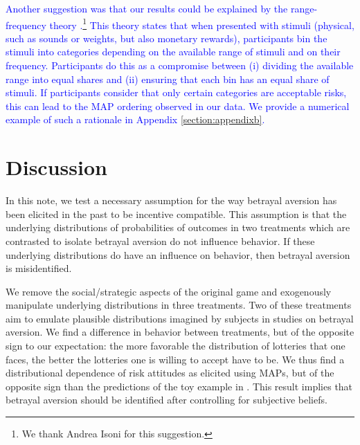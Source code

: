 \textcolor{blue}{Another suggestion was that our results could be explained by the range-frequency theory \citep{Parducci1965,Parducci1971}.\footnote{We thank Andrea Isoni for this suggestion.}}
\textcolor{blue}{This theory states that when presented with stimuli (physical, such as sounds or weights, but also monetary rewards), participants bin the stimuli into categories depending on the available range of stimuli and on their frequency.
Participants do this as a compromise between (i) dividing the available range into equal shares and (ii) ensuring that each bin has an equal share of stimuli. If participants consider that only certain categories are acceptable risks, this can lead to the MAP ordering observed in our data.
We provide a numerical example of such a rationale in Appendix \ref{section:appendixb}.}


\section{Discussion}\label{sec:discussion}
In this note, we test a necessary assumption for the way betrayal aversion has been elicited in the past to be incentive compatible.
This assumption is that the underlying distributions of probabilities of outcomes in two treatments which are contrasted to isolate betrayal aversion do not influence behavior.
If these underlying distributions do have an influence on behavior, then betrayal aversion is misidentified.

We remove the social/strategic aspects of the original game and exogenously manipulate underlying distributions in three treatments.
Two of these treatments aim to emulate plausible distributions imagined by subjects in studies on betrayal aversion.
%
We find a difference in behavior between treatments, but of the opposite sign to our expectation: the more favorable the distribution of lotteries that one faces, the better the lotteries one is willing to accept have to be.
We thus find a distributional dependence of risk attitudes as elicited using MAPs, but of the opposite sign than the predictions of the toy example in \cite{Li2020a}.
This result implies that betrayal aversion should be identified after controlling for subjective beliefs.

